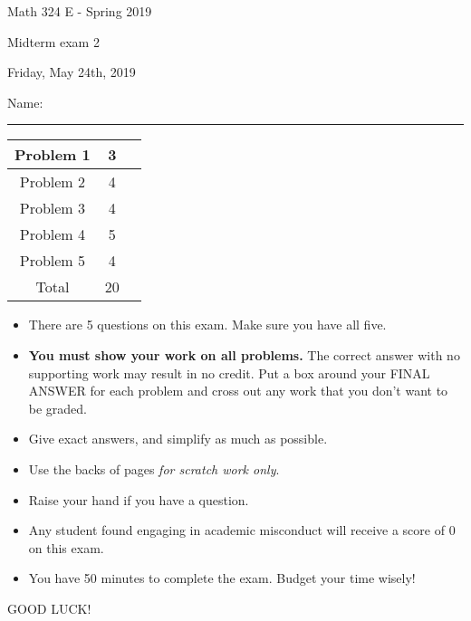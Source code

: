 \documentclass[12 pt]{report}
\begin{document}
\noindent \vfill \noindent \large

\centerline{Math 324 E  - Spring 2019}

\centerline{Midterm exam 2}

\centerline{Friday, May 24th, 2019}

\normalsize

\vfill
\medskip
Name: \rule{10cm}{1pt}

\bigskip

\vfill
\begin{center}
{\large
\begin{tabular}{||c|c|r||}
\hline Problem 1 & 3 & \hspace{10mm} \hfill \\
\hline Problem 2 & 4 & \hspace{10mm} \hfill \\
\hline Problem 3 & 4 & \hspace{10mm} \hfill \\
\hline Problem 4 & 5 & \hspace{10mm} \hfill \\
\hline Problem 5 & 4 & \hspace{10mm} \hfill \\
\hline Total & 20 & \hspace{10mm} \hfill \\
\hline
\end{tabular}
}
\end{center}
\vfill
\begin{itemize}
\item There are 5 questions on this exam. Make sure you have all five.
\item \textbf{You must show your work on all problems.}  The correct answer
with no supporting work may result in no credit. Put a box
around your FINAL ANSWER for each problem and cross out any work
that you don't want to be graded.
\item Give exact answers, and simplify as much as possible. 
\item Use the backs of pages \textit{for scratch work only}.
\item Raise your hand if you have a question.
\item Any student found engaging in academic misconduct will receive
a score of 0 on this exam.
\item You have 50 minutes to complete the exam.  Budget your time wisely! \\
\end{itemize}
\vfill
\begin{center}GOOD LUCK!\end{center}
\end{document}
